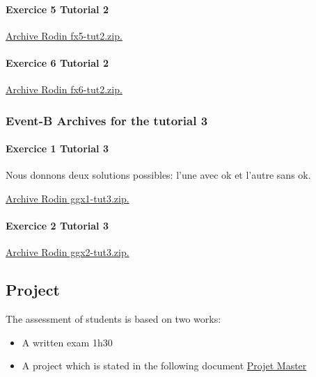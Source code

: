 \documentclass[ 12pt]{article}
\begin{document}
\paragraph{Exercice 5 Tutorial 2}
\href{http://mery54.github.io/teaching/mosos/models/fx5-tut2.zip}{Archive 
  Rodin   fx5-tut2.zip.}



\paragraph{Exercice 6 Tutorial 2}
\href{http://mery54.github.io/teaching/mosos/models/fx6-tut2.zip}{Archive 
  Rodin   fx6-tut2.zip.}



 \subsubsection{Event-B Archives for   the tutorial 3}
\label{sec:event-b-archives}

\paragraph{Exercice 1 Tutorial 3}

Nous donnons deux solutions possibles: l'une avec ok et l'autre sans ok.

\href{http://mery54.github.io/teaching/mosos/models/qqx1-tut3.zip}{Archive 
  Rodin   ggx1-tut3.zip.}




\paragraph{Exercice 2 Tutorial 3}

\href{http://mery54.github.io/teaching/mosos/models/ggx2-tut3.zip}{Archive 
  Rodin   ggx2-tut3.zip.}






  \subsection{Project}
\label{sec:project}

The assessment  of students is based on two works:
\begin{itemize}
\item A written  exam   1h30
\item A project which is stated in the following document
  \href{http://mery54.github.io/teaching/mosos/lecturesnotes/master-projets2425.pdf}{Projet
    Master } 
\end{itemize}
\end{document}
